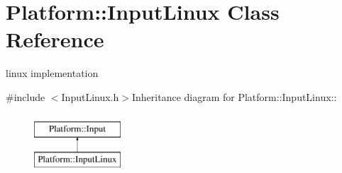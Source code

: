 \hypertarget{classPlatform_1_1InputLinux}{
\section{Platform::InputLinux Class Reference}
\label{classPlatform_1_1InputLinux}
}


linux implementation  


{\ttfamily \#include $<$InputLinux.h$>$}Inheritance diagram for Platform::InputLinux::\begin{figure}[H]
\begin{center}
\leavevmode
\includegraphics[height=2cm]{classPlatform_1_1InputLinux}
\end{center}
\end{figure}
